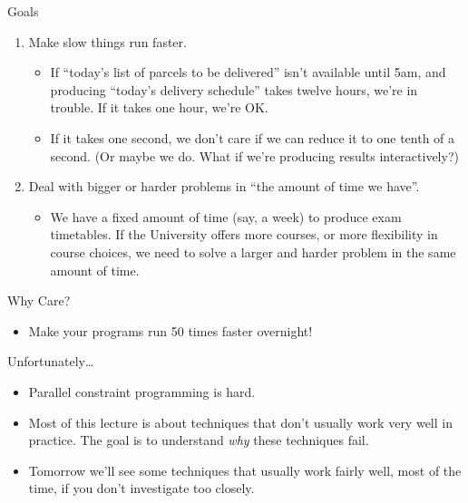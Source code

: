 \documentclass{beamer}
\begin{document}
\begin{frame}{Goals}
    \begin{enumerate}
        \item Make slow things run faster.
            \begin{itemize}
                \item If ``today's list of parcels to be delivered'' isn't available until 5am, and
                    producing ``today's delivery schedule'' takes twelve hours, we're in trouble. If
                    it takes one hour, we're OK.

                \item If it takes one second, we don't care if we can reduce it to one tenth of a
                    second. (Or maybe we do. What if we're producing results interactively?)
            \end{itemize}

        \item Deal with bigger or harder problems in ``the amount of time we have''.
            \begin{itemize}
                \item We have a fixed amount of time (say, a week) to produce exam timetables. If
                    the University offers more courses, or more flexibility in course choices, we
                    need to solve a larger and harder problem in the same amount of time.
            \end{itemize}
    \end{enumerate}
\end{frame}

\begin{frame}{Why Care?}
    \begin{itemize}
        \item Make your programs run 50 times faster overnight!
    \end{itemize}
\end{frame}

\begin{frame}{Unfortunately\ldots}
    \begin{itemize}
        \item Parallel constraint programming is hard.
        \item Most of this lecture is about techniques that don't usually work very well in
            practice. The goal is to understand \emph{why} these techniques fail.
        \item Tomorrow we'll see some techniques that usually work fairly well, most of the time, if
            you don't investigate too closely.
    \end{itemize}
\end{frame}
\end{document}
